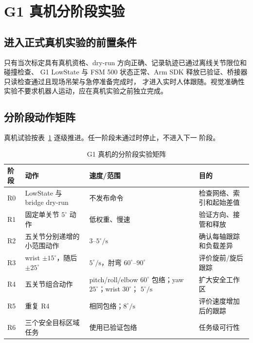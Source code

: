 \section{G1 真机分阶段实验}
\label{sec:ch6_real_robot_experiment}

\subsection{进入正式真机实验的前置条件}
\label{subsec:ch6_real_robot_prerequisites}

只有当次标定具有真机资格、dry-run 方向正确、记录轨迹已通过离线关节限位和碰撞检查、
G1 LowState 与 FSM 500 状态正常、Arm SDK 释放已验证、桥接器只读检查通过且现场吊架与急停准备完成时，
才进入实时人体跟随。视觉准确性实验不要求机器人运动，应在真机实验之前独立完成。

\subsection{分阶段动作矩阵}
\label{subsec:ch6_real_robot_matrix}

真机试验按表~\ref{tab:ch6_real_robot_stages} 逐级推进。任一阶段未通过时停止，不进入下一
阶段。
\begin{table}[htbp]
  \centering
  \caption{G1 真机的分阶段实验矩阵}
  \label{tab:ch6_real_robot_stages}
  \begin{tabularx}{\linewidth}{@{}lXXX@{}}
    \toprule
    阶段 & 动作 & 速度/范围 & 目的 \\
    \midrule
    R0 & LowState 与 bridge dry-run & 不发布命令 & 检查网络、索引和起始差值 \\
    R1 & 固定单关节 $5^\circ$ 动作 & 低权重、慢速 & 验证方向、接管和释放 \\
    R2 & 五关节分别递增的小范围动作 & $3$--$5^\circ/\mathrm s$ & 确认每轴跟踪和负载差异 \\
    R3 & wrist $\pm15^\circ$，随后 $\pm25^\circ$
       & $5^\circ/\mathrm s$，肘弯 $60^\circ$--$90^\circ$ & 评价旋前/旋后跟踪 \\
    R4 & 五关节组合动作
       & pitch/roll/elbow $60^\circ$ 包络；yaw $25^\circ$；wrist $30^\circ$；
         $5^\circ/\mathrm s$ & 扩大安全工作区 \\
    R5 & 重复 R4 & 相同包络；$8^\circ/\mathrm s$ & 评价速度增加后的跟踪 \\
    R6 & 三个安全目标区域任务 & 使用已验证包络 & 任务级可行性 \\
    \bottomrule
  \end{tabularx}
\end{table}

